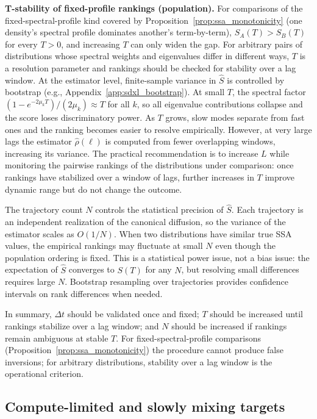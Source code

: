 \documentclass{article}
\begin{document}
 \textbf{T-stability of fixed-profile rankings (population).} For comparisons of the fixed-spectral-profile kind covered by Proposition~\ref{prop:ssa_monotonicity} (one density's spectral profile dominates another's term-by-term), $S_A(T) > S_B(T)$ for every $T > 0$, and increasing $T$ can only widen the gap. For arbitrary pairs of distributions whose spectral weights and eigenvalues differ in different ways, $T$ is a resolution parameter and rankings should be checked for stability over a lag window. At the estimator level, finite-sample variance in $\hat{S}$ is controlled by bootstrap (e.g., Appendix~\ref{app:sdxl_bootstrap}). At small $T$, the spectral factor $(1 - e^{-2\mu_k T})/(2\mu_k) \approx T$ for all $k$, so all eigenvalue contributions collapse and the score loses discriminatory power. As $T$ grows, slow modes separate from fast ones and the ranking becomes easier to resolve empirically. However, at very large lags the estimator $\hat{\rho}(\ell)$ is computed from fewer overlapping windows, increasing its variance. The practical recommendation is to increase $L$ while monitoring the pairwise rankings of the distributions under comparison: once rankings have stabilized over a window of lags, further increases in $T$ improve dynamic range but do not change the outcome.

The trajectory count $N$ controls the statistical precision of $\hat{S}$. Each trajectory is an independent realization of the canonical diffusion, so the variance of the estimator scales as $O(1/N)$. When two distributions have similar true SSA values, the empirical rankings may fluctuate at small $N$ even though the population ordering is fixed. This is a statistical power issue, not a bias issue: the expectation of $\hat{S}$ converges to $S(T)$ for any $N$, but resolving small differences requires large $N$. Bootstrap resampling over trajectories provides confidence intervals on rank differences when needed.

In summary, $\Delta t$ should be validated once and fixed; $T$ should be increased until rankings stabilize over a lag window; and $N$ should be increased if rankings remain ambiguous at stable $T$. For fixed-spectral-profile comparisons (Proposition~\ref{prop:ssa_monotonicity}) the procedure cannot produce false inversions; for arbitrary distributions, stability over a lag window is the operational criterion.

\subsection{Compute-limited and slowly mixing targets}
\label{app:compute_limited}
\end{document}
